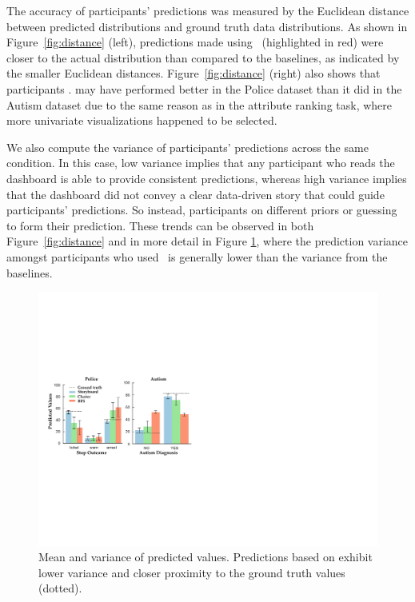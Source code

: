 \par The accuracy of participants' predictions was measured by the Euclidean distance between  predicted distributions and ground truth data distributions. As shown in Figure~\ref{fig:distance} (left), predictions made using \system\ (highlighted in red) were closer to the actual distribution than compared to the baselines, as indicated by the smaller Euclidean distances. Figure~\ref{fig:distance} (right) also shows that \system participants . \cluster may have performed better in the Police dataset than it did in the Autism dataset due to the same reason as in the attribute ranking task, where more univariate visualizations happened to be selected.
\par We also compute the variance of participants' predictions across the same condition. In this case, low variance implies that any participant who reads the dashboard is able to provide consistent predictions, whereas high variance implies that the dashboard did not convey a clear data-driven story that could guide participants' predictions. So instead, participants  on different priors or guessing to form their prediction. These trends can be observed in both Figure~\ref{fig:distance} and in more detail in Figure \ref{fig:actual_predictions}, where the prediction variance amongst participants who used \system\ is generally lower than the variance from the baselines. 
\begin{figure}[h!]
\centering
\includegraphics[width=0.85\linewidth]{figures/prediction.pdf}
\caption{Mean and variance of predicted values. Predictions based on \system exhibit lower variance  and closer proximity to the ground truth values (dotted).}
\label{fig:actual_predictions}
\end{figure}
